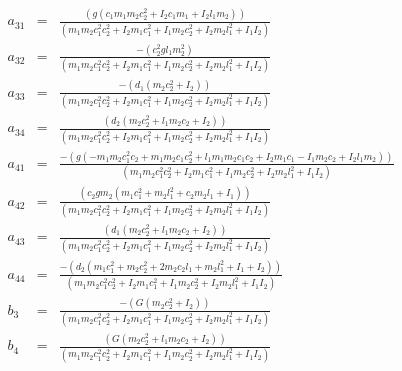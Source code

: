 \documentclass[main.tex]{subfiles}
\begin{document}
\begin{eqnarray*}
a_{31} &=& \frac{(g (c_1 m_1 m_2 c_2^2 + I_2 c_1 m_1 + I_2 l_1 m_2))}{(m_1 m_2 c_1^2 c_2^2 + I_2 m_1 c_1^2 + I_1 m_2 c_2^2 + I_2 m_2 l_1^2 + I_1 I_2)} \\
a_{32} &=& \frac{ - ( c_2^2 g l_1 m_2^2 )}{( m_1 m_2 c_1^2 c_2^2 + I_2 m_1 c_1^2 + I_1 m_2 c_2^2 + I_2 m_2 l_1^2 + I_1 I_2)} \\
a_{33} &=&  \frac{- ( d_1 ( m_2 c_2^2 + I_2 ) )}{( m_1 m_2 c_1^2 c_2^2 + I_2 m_1 c_1^2 + I_1 m_2 c_2^2 + I_2 m_2 l_1^2 + I_1 I_2)} \\
a_{34} &=&  \frac{( d_2 ( m_2  c_2^2 + l_1 m_2 c_2 + I_2 ) )}{( m_1 m_2 c_1^2 c_2^2 + I_2 m_1 c_1^2 + I_1 m_2 c_2^2 + I_2 m_2 l_1^2 + I_1 I_2)} \\
a_{41} &=&  \frac{- ( g ( - m_1 m_2 c_1^2 c_2 + m_1 m_2 c_1 c_2^2 + l_1 m_1 m_2 c_1 c_2 + I_2 m_1 c_1 - I_1 m_2 c_2 + I_2 l_1 m_2 ) )}{( m_1 m_2 c_1^2 c_2^2 + I_2 m_1 c_1^2 + I_1 m_2 c_2^2 + I_2 m_2 l_1^2 + I_1 I_2)} \\
a_{42} &=&  \frac{(c_2 g m_2 ( m_1 c_1^2 + m_2 l_1^2 + c_2 m_2 l_1 + I_1))}{(m_1 m_2 c_1^2 c_2^2 + I_2 m_1 c_1^2 + I_1 m_2 c_2^2 + I_2 m_2 l_1^2 + I_1 I_2)} \\
a_{43} &=&  \frac{(d_1 (m_2 c_2^2 + l_1 m_2 c_2 + I_2))}{(m_1 m_2 c_1^2 c_2^2 + I_2 m_1 c_1^2 + I_1 m_2 c_2^2 + I_2 m_2 l_1^2 + I_1 I_2)} \\
a_{44} &=&  \frac{ - ( d_2 ( m_1 c_1^2 + m_2 c_2^2 + 2 m_2 c_2 l_1 + m_2 l_1^2 + I_1 + I_2))}{(m_1 m_2 c_1^2 c_2^2 + I_2 m_1 c_1^2 + I_1 m_2 c_2^2 + I_2 m_2 l_1^2 + I_1 I_2)} \\
b_{3} &=&  \frac{ - ( G ( m_2 c_2^2 + I_2 ) )}{ ( m_1 m_2 c_1^2 c_2^2 + I_2 m_1 c_1^2 + I_1 m_2 c_2^2 + I_2 m_2 l_1^2 + I_1 I_2)} \\
b_{4} &=&  \frac{( G ( m_2 c_2^2 + l_1 m_2 c_2 + I_2 ) )}{( m_1 m_2 c_1^2 c_2^2 + I_2 m_1 c_1^2 + I_1 m_2 c_2^2 + I_2 m_2 l_1^2 + I_1 I_2)} \\
\end{eqnarray*}
\end{document}
